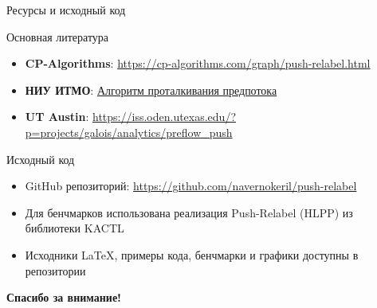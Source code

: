 \documentclass[14pt, aspectratio=169]{beamer}
\begin{document}
\begin{frame}{Ресурсы и исходный код}
\scriptsize

\begin{block}{Основная литература}
\begin{itemize}
\item \textbf{CP-Algorithms}: \url{https://cp-algorithms.com/graph/push-relabel.html}
\item \textbf{НИУ ИТМО}: \href{https://neerc.ifmo.ru/wiki/index.php?title=Метод_проталкивания_предпотока}{Алгоритм проталкивания предпотока}
\item \textbf{UT Austin}: \url{https://iss.oden.utexas.edu/?p=projects/galois/analytics/preflow_push}
\end{itemize}
\end{block}

\begin{block}{Исходный код}
\begin{itemize}
\item GitHub репозиторий: \url{https://github.com/navernokeril/push-relabel}
\item Для бенчмарков использована реализация Push-Relabel (HLPP) из библиотеки KACTL
\item Исходники LaTeX, примеры кода, бенчмарки и графики доступны в репозитории
\end{itemize}
\end{block}

\begin{center}
\vspace{0.5cm}
\textbf{Спасибо за внимание!}
\end{center}
\end{frame}
\end{document}
